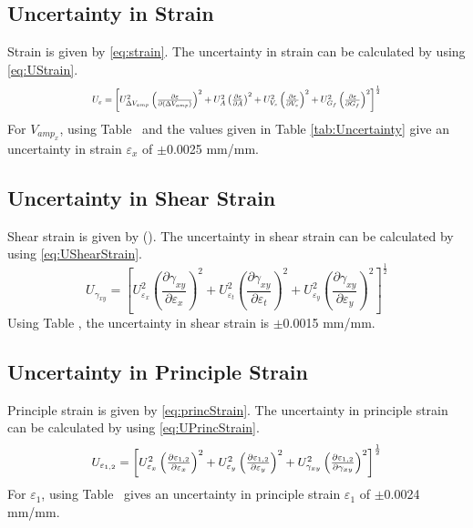 \documentclass[10pt,journal,letterpaper]{IEEEtran}
\begin{document}
\subsection*{Uncertainty in Strain}

Strain is given by \eqref{eq:strain}.
The uncertainty in strain can be calculated by using \eqref{eq:UStrain}.
\begin{equation}
\label{eq:UStrain}
\resizebox{227pt}{!}{$U_{\varepsilon}=\left[U_{\Delta V_{amp}}^2 \left(\frac{\partial \varepsilon}{\partial (\Delta V_{amp})}\right)^2 + U_{A}^2 \left(\frac{\partial \varepsilon}{\partial A}\right)^2 + U_{V_s}^2 \left(\frac{\partial \varepsilon}{\partial V_s}\right)^2 + U_{G_f}^2 \left(\frac{\partial \varepsilon}{\partial G_f}\right)^2 \right]^{\frac{1}{2}}$}
\end{equation}
For $V_{amp_{x}}$, using Table \todo\ and the values given in Table \ref{tab:Uncertainty} give an uncertainty in strain $\varepsilon_x$ of $\pm$0.0025 mm/mm.

\subsection*{Uncertainty in Shear Strain}

Shear strain is given by (\todo).
The uncertainty in shear strain can be calculated by using \eqref{eq:UShearStrain}.
\begin{equation}
\label{eq:UShearStrain}
U_{\gamma_{xy}}=\left[U_{\varepsilon_x}^2 \left(\frac{\partial \gamma_{xy}}{\partial \varepsilon_x}\right)^2 + U_{\varepsilon_t}^2 \left(\frac{\partial \gamma_{xy}}{\partial \varepsilon_t}\right)^2 + U_{\varepsilon_y}^2 \left(\frac{\partial \gamma_{xy}}{\partial \varepsilon_y}\right)^2 \right]^{\frac{1}{2}}
\end{equation}
Using Table \todo, the uncertainty in shear strain is $\pm$0.0015 mm/mm.

\subsection*{Uncertainty in Principle Strain}

Principle strain is given by \eqref{eq:princStrain}.
The uncertainty in principle strain can be calculated by using \eqref{eq:UPrincStrain}.
\begin{equation}
\label{eq:UPrincStrain}
\resizebox{227pt}{!}{$U_{\varepsilon_{1,2}}=\left[U_{\varepsilon_x}^2 \left(\frac{\partial \varepsilon_{1,2}}{\partial \varepsilon_x}\right)^2 + U_{\varepsilon_y}^2 \left(\frac{\partial \varepsilon_{1,2}}{\partial \varepsilon_y}\right)^2 + U_{\gamma_{xy}}^2 \left(\frac{\partial \varepsilon_{1,2}}{\partial \gamma_{xy}}\right)^2 \right]^{\frac{1}{2}}$}
\end{equation}
For $\varepsilon_1$, using Table \todo\ gives an uncertainty in principle strain $\varepsilon_1$ of $\pm$0.0024 mm/mm.
\end{document}
